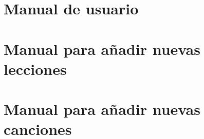 \documentclass[a4paper,12pt]{scrbook}
\begin{document}
\chapter{Manual de usuario}

\chapter{Manual para añadir nuevas lecciones}

\chapter{Manual para añadir nuevas canciones}








\printindex
\end{document}
